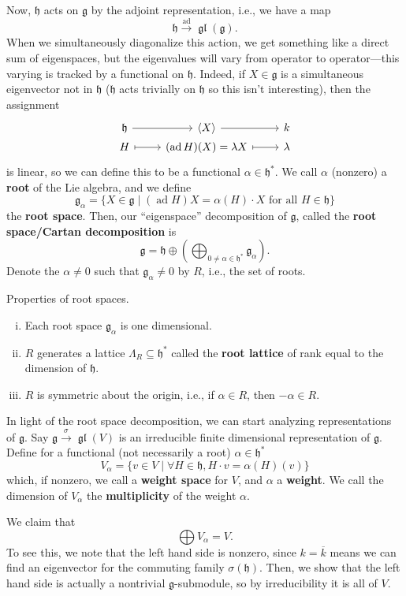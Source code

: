 \documentclass[12pt]{article}
\newcommand{\fg}{\mathfrak{g}}
\newcommand{\fh}{\mathfrak{h}}
\newcommand{\gl}{\operatorname{\mathfrak{gl}}}
\DeclareMathOperator{\ad}{ad}
\begin{document}
Now, $\fh$ acts on $\fg$ by the adjoint representation, i.e., we have a map
\[\fh \xrightarrow{\ad} \gl(\fg).\]
When we simultaneously diagonalize this action, we get something like a direct sum of eigenspaces, but the eigenvalues will vary from operator to operator---this varying is tracked by a functional on $\fh$. Indeed, if $X\in \fg$ is a simultaneous eigenvector not in $\fh$ ($\fh$ acts trivially on $\fh$ so this isn't interesting), then the assignment
\[\begin{tikzcd}[row sep=0cm]
    \fh \rar & \<X\> \rar & k\\
    H \rar[mapsto] & (\ad H)(X) = \lambda X \rar[mapsto] & \lambda
\end{tikzcd}\]
is linear, so we can define this to be a functional $\alpha\in \fh^*$. We call $\alpha$ (nonzero) a \textbf{root} of the Lie algebra, and we define
\[\fg_\alpha = \{X\in \fg \mid (\ad H)X = \alpha(H)\cdot X \text{ for all } H\in \fh\}\]
the \textbf{root space}. Then, our ``eigenspace'' decomposition of $\fg$, called the \textbf{root space/Cartan decomposition} is
\[\fg = \fh \oplus (\bigoplus_{0\neq \alpha \in \fh^*} \fg_\alpha).\]
Denote the $\alpha\neq 0$ such that $\fg_\alpha\neq 0$ by $R$, i.e., the set of roots.

\begin{prop}
    Properties of root spaces.
    \begin{enumerate}[(i)]
        \item Each root space $\fg_\alpha$ is one dimensional.
        \item $R$ generates a lattice $\Lambda_R \subseteq \fh^*$ called the \textbf{root lattice} of rank equal to the dimension of $\fh$.
        \item $R$ is symmetric about the origin, i.e., if $\alpha\in R$, then $-\alpha \in R$.
    \end{enumerate}
\end{prop}

In light of the root space decomposition, we can start analyzing representations of $\fg$. Say $\fg \xrightarrow{\sigma} \gl(V)$ is an irreducible finite dimensional representation of $\fg$. Define for a functional (not necessarily a root) $\alpha\in \fh^*$
\[V_\alpha = \{v\in V \mid \forall H\in \fh, H\cdot v = \alpha(H)(v)\}\]
which, if nonzero, we call a \textbf{weight space} for $V$, and $\alpha$ a \textbf{weight}. We call the dimension of $V_\alpha$ the \textbf{multiplicity} of the weight $\alpha$. 

We claim that
\[\bigoplus V_\alpha = V.\]
To see this, we note that the left hand side is nonzero, since $k=\overline{k}$ means we can find an eigenvector for the commuting family $\sigma(\fh)$. Then, we show that the left hand side is actually a nontrivial $\fg$-submodule, so by irreducibility it is all of $V$.
\end{document}

